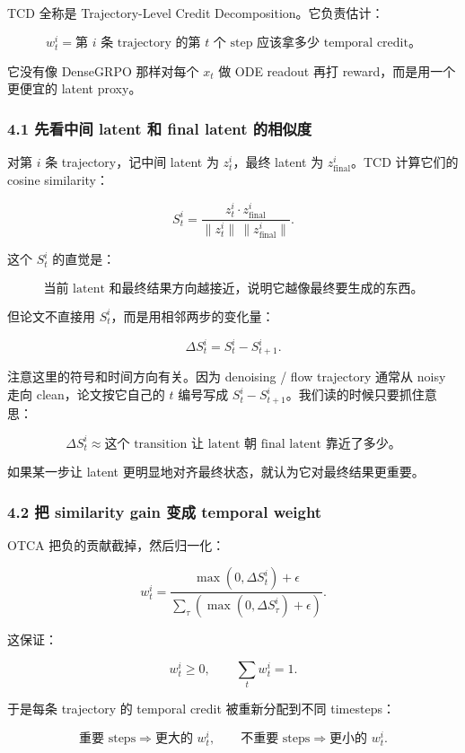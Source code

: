 TCD 全称是 Trajectory-Level Credit Decomposition。它负责估计：

\[
w_t^i
=
\text{第 \(i\) 条 trajectory 的第 \(t\) 个 step 应该拿多少 temporal credit。}
\]

它没有像 DenseGRPO 那样对每个 \(x_t\) 做 ODE readout 再打 reward，而是用一个更便宜的 latent proxy。

\subsubsection{4.1 先看中间 latent 和 final latent 的相似度}

对第 \(i\) 条 trajectory，记中间 latent 为 \(z_t^i\)，最终 latent 为 \(z_{\mathrm{final}}^i\)。TCD 计算它们的 cosine similarity：

\[
S_t^i
=
\frac{
z_t^i \cdot z_{\mathrm{final}}^i
}{
\|z_t^i\|\,\|z_{\mathrm{final}}^i\|
}.
\]

这个 \(S_t^i\) 的直觉是：

\[
\text{当前 latent 和最终结果方向越接近，说明它越像最终要生成的东西。}
\]

但论文不直接用 \(S_t^i\)，而是用相邻两步的变化量：

\[
\Delta S_t^i
=
S_t^i-S_{t+1}^i .
\]

注意这里的符号和时间方向有关。因为 denoising / flow trajectory 通常从 noisy 走向 clean，论文按它自己的 \(t\) 编号写成 \(S_t^i-S_{t+1}^i\)。我们读的时候只要抓住意思：

\[
\Delta S_t^i
\approx
\text{这个 transition 让 latent 朝 final latent 靠近了多少。}
\]

如果某一步让 latent 更明显地对齐最终状态，就认为它对最终结果更重要。

\subsubsection{4.2 把 similarity gain 变成 temporal weight}

OTCA 把负的贡献截掉，然后归一化：

\[
w_t^i
=
\frac{
\max(0,\Delta S_t^i)+\epsilon
}{
\sum_{\tau}
\left(
\max(0,\Delta S_\tau^i)+\epsilon
\right)
}.
\]

这保证：

\[
w_t^i \ge 0,
\qquad
\sum_t w_t^i = 1.
\]

于是每条 trajectory 的 temporal credit 被重新分配到不同 timesteps：

\[
\text{重要 steps}
\Rightarrow
\text{更大的 }w_t^i,
\qquad
\text{不重要 steps}
\Rightarrow
\text{更小的 }w_t^i.
\]

